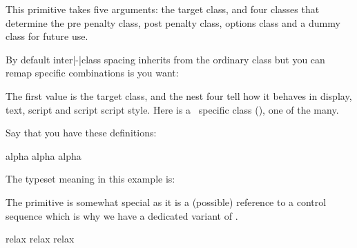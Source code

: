 \stopnewprimitive

\startnewprimitive[title={\prm {letmathparent}}]

This primitive takes five arguments: the target class, and four classes that
determine the pre penalty class, post penalty class, options class and a dummy
class for future use.

\stopnewprimitive

\startnewprimitive[title={\prm {letmathspacing}}]

By default inter|-|class spacing inherits from the ordinary class but you can
remap specific combinations is you want:

\starttyping
{} \mathfunctioncode
    \mathordinarycode \mathordinarycode
    \mathordinarycode \mathordinarycode
\stoptyping

The first value is the target class, and the nest four tell how it behaves in
display, text, script and script script style. Here \typ {\mathfunctioncode} is a
\CONTEXT\ specific class (\the\mathfunctioncode), one of the many.

\stopnewprimitive

\startnewprimitive[title={\prm {letprotected}}]

Say that you have these definitions:

\startbuffer
             \def  \MyMacroA{alpha}
\protected   {}
             \edef \MyMacroC{\MyMacroA\MyMacroB}
      \MyMacroA
             \edef \MyMacroD{\MyMacroA\MyMacroB}
\meaning           \MyMacroC\crlf
\meaning           \MyMacroD\par
\stopbuffer

\typebuffer

The typeset meaning in this example is:

{\tttf \getbuffer}

\stopnewprimitive

\startnewprimitive[title={\prm {lettolastnamedcs}}]

The  primitive is somewhat special as it is a (possible)
reference to  a control sequence which is why we have a dedicated variant of
.

\startbuffer
\csname relax\endcsname\let                         \foo\lastnamedcs \meaning\foo
\csname relax\endcsname\expandafter\let\expandafter \oof\lastnamedcs \meaning\oof
\csname relax\endcsname{}            \ofo             \meaning\ofo
\stopbuffer

\typebuffer %

